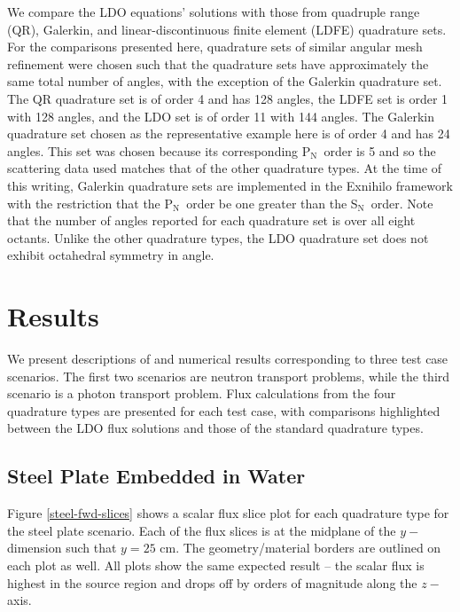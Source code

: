 \documentclass{article} %
\newcommand{\sn}{S$_\mathrm{N}$}
\newcommand{\pn}{P$_\mathrm{N}$}
\begin{document}
We compare the LDO equations' solutions with those from quadruple range (QR),
Galerkin, and linear-discontinuous finite element (LDFE) quadrature sets.
For the comparisons presented here, quadrature sets of similar angular mesh
refinement were chosen such that the quadrature sets have approximately the 
same total number of angles, with the exception of the Galerkin quadrature set.
The QR quadrature set is of order 4 and has 128 angles, the LDFE set is order 1
with 128 angles, and the LDO set is of order 11 with 144 angles. 
The Galerkin quadrature set chosen as the representative example here is of
order 4 and has 24 angles. This set was chosen because its corresponding \pn\
order is 5 and so the scattering data used matches that of the other quadrature
types. At the time of this writing, Galerkin quadrature sets are implemented in
the Exnihilo framework with the restriction that the \pn\ order be one greater
than the \sn\ order. Note that the number of angles reported for each quadrature
set is over all eight octants. Unlike the other quadrature types, the LDO
quadrature set does not exhibit octahedral symmetry in angle. %

\section{Results}
\label{sec:results}

We present descriptions of and numerical results corresponding to three test
case scenarios. The first two scenarios are neutron transport problems, while
the third scenario is a photon transport problem. Flux calculations from the
four quadrature types are presented for each test case, with comparisons
highlighted between the LDO flux solutions and those of the standard
quadrature types.

\subsection{Steel Plate Embedded in Water}

Figure \ref{steel-fwd-slices} shows a scalar flux slice plot for each
quadrature type for the steel plate scenario.  Each of the flux slices is at
the midplane of the $y-$dimension such that $y = 25$ cm. The geometry/material
borders are outlined on each plot as well. All plots show the same expected
result -- the scalar flux is highest in the source region and drops off by
orders of magnitude along the $z-$axis.
\end{document}

